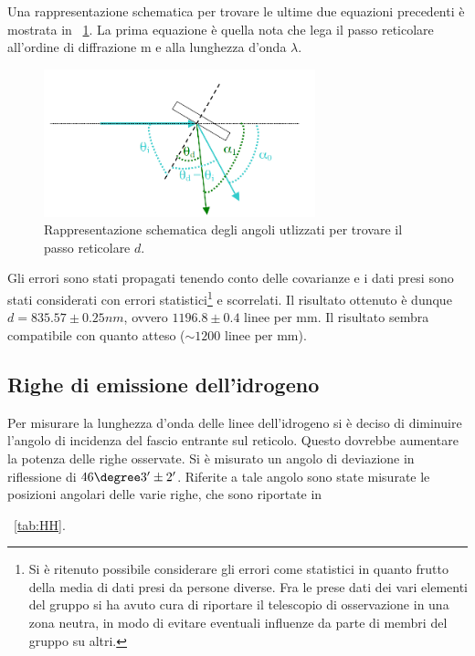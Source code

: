 \documentclass[a4paper,10pt]{article}
\begin{document}
{{{{{Una rappresentazione schematica per trovare le ultime due equazioni precedenti è mostrata in \figurename{~\ref{fig:angoli}}. La prima equazione è quella nota che lega il passo reticolare all'ordine di diffrazione m e alla lunghezza d'onda $\lambda$.


\begin{figure}[H]
	\centering
	\includegraphics[width=0.7\textwidth]{../grafici/Angoli.png}
	\caption{Rappresentazione schematica degli angoli utlizzati per trovare il passo reticolare $d$.}
	\label{fig:angoli}
\end{figure}

Gli errori sono stati propagati tenendo conto delle covarianze e i dati presi sono stati considerati con errori statistici\footnote{Si è ritenuto possibile considerare gli errori come statistici in quanto frutto della media di dati presi da persone diverse. Fra le prese dati dei vari elementi del gruppo si ha avuto cura di riportare il telescopio di osservazione in una zona neutra, in modo di evitare eventuali influenze da parte di membri del gruppo su altri.} e scorrelati. 
Il risultato ottenuto è dunque $d=835.57 \pm 0.25 nm$, ovvero $1196.8 \pm 0.4$ linee per mm. Il risultato sembra compatibile con quanto atteso ($\sim 1200$ linee per mm).

\subsection{Righe di emissione dell'idrogeno}

Per misurare la lunghezza d'onda delle linee dell'idrogeno si è deciso di diminuire l'angolo di incidenza del fascio entrante sul reticolo. Questo
dovrebbe aumentare la potenza delle righe osservate. Si è misurato un angolo di deviazione in riflessione di $46\degree 3' \pm 2'$. Riferite a tale angolo sono state misurate le posizioni angolari delle varie righe, che sono riportate in \tablename{~\ref{tab:HH}.

}}}}}}
\end{document}
